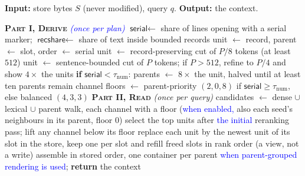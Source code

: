 \documentclass{article}
\newcommand{\nativechange}[1]{\textcolor{blue}{#1}}
\newcommand{\sys}{\textsc{Muster}}
\newcommand{\serial}{\textsf{serial}}
\newcommand{\cov}{\textsf{recshare}}
\begin{document}
\begin{algorithm}[H]
\small
\caption{\sys{}. \nativechange{Part~I runs detection, including the policy gate (step~11), once per plan with no model. On MemoryAgentBench, the original implementation derives a representation for each cell from its first up to three stores.} \nativechange{Part~II (retrieval and context assembly) uses one query embedding, an initial rerank and one reader call per query. The SDK's numbered-fact walk can add rerank rounds.} $\tau_{\mathrm{num}}=0.80$ and $\tau_{\mathrm{rec}}=0.90$, and $P$ is the benchmark's chunk ($512$ or $4096$, Table~\ref{tab:hyper}). LongMemEval keeps its delivered rounds and sessions as units and parents (Section~\ref{sec:rule}).}
\label{alg:muster}
\footnotesize
\textbf{Input:} store bytes $S$ (never modified), query $q$. \textbf{Output:} the context.
\begin{algorithmic}[1]
\STATE \textbf{\textsc{Part I, Derive}} \emph{\nativechange{(once per plan)}}
\STATE $\serial \gets$ share of lines opening with a serial marker; $\cov \gets$ share of text inside bounded records
\IF{$\serial \ge \tau_{\mathrm{num}}$}
  \STATE unit $\gets$ record, parent $\gets$ slot, order $\gets$ serial
\ELSIF{$\cov \ge \tau_{\mathrm{rec}}$}
  \STATE unit $\gets$ record-preserving cut of $P/8$ tokens (at least $512$)
\ELSE
  \STATE unit $\gets$ sentence-bounded cut of $P$ tokens; if $P>512$, refine to $P/4$ and show $4\times$ the units
\ENDIF
\STATE \textbf{if} $\serial < \tau_{\mathrm{num}}$: parents $\gets$ $8\times$ the unit, halved until at least ten parents remain
\STATE channel floors $\gets$ parent-priority $(2,0,8)$ if $\serial \ge \tau_{\mathrm{num}}$, else balanced $(4,3,3)$
\STATE \textbf{\textsc{Part II, Read}} \emph{(once per query)}
\STATE candidates $\gets$ dense $\cup$ lexical $\cup$ parent walk, each channel with a floor (\nativechange{when enabled,} also each seed's neighbours in its parent, floor $0$)
\STATE select the top units after \nativechange{the initial} reranking pass; lift any channel below its floor\label{alg:lift}
 \STATE replace each unit by the newest unit of its slot in the store, keep one per slot and refill freed slots in rank order (a view, not a write) \ENDIF
\STATE assemble in stored order, one container per parent \nativechange{when parent-grouped rendering is used}; \textbf{return} the context
\end{algorithmic}
\end{algorithm}
\end{document}
